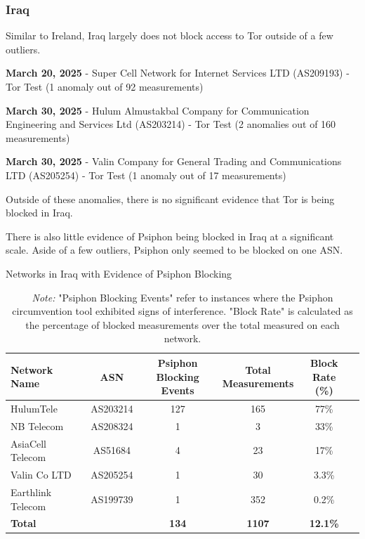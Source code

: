 \subsubsection{Iraq}

Similar to Ireland, Iraq largely does not block access to Tor outside of a few outliers.

\textbf{March 20, 2025} - Super Cell Network for Internet Services LTD (AS209193) - Tor Test (1 anomaly out of 92 measurements)

\textbf{March 30, 2025} - Hulum Almustakbal Company for Communication Engineering and Services Ltd (AS203214) - Tor Test (2 anomalies out of 160 measurements)

\textbf{March 30, 2025} - Valin Company for General Trading and Communications LTD (AS205254) - Tor Test (1 anomaly out of 17 measurements)

Outside of these anomalies, there is no significant evidence that Tor is being blocked in Iraq.

There is also little evidence of Psiphon being blocked in Iraq at a significant scale. Aside of a few outliers, Psiphon only seemed to be blocked on one ASN. 

\vspace{2em}

\begin{table}[H]
\centering
\caption{Networks in Iraq with Evidence of Psiphon Blocking}
\begin{tabular}{lccccc}
\toprule
\textbf{Network Name} & \textbf{ASN} & \shortstack{\textbf{Psiphon} \\ \textbf{Blocking Events}} & \shortstack{\textbf{Total} \\ \textbf{Measurements}} & \shortstack{\textbf{Block} \\ \textbf{Rate (\%)}} \\
\midrule
HulumTele             & AS203214  & 127 & 165  & 77\%   \\
NB Telecom            & AS208324  & 1   & 3    & 33\%   \\
AsiaCell Telecom      & AS51684   & 4   & 23   & 17\%   \\
Valin Co LTD          & AS205254  & 1   & 30   & 3.3\%  \\
Earthlink Telecom     & AS199739  & 1   & 352  & 0.2\%  \\
\bottomrule
\textbf{Total}        &           & \textbf{134} & \textbf{1107} & \textbf{12.1\%} \\
\end{tabular}

\vspace{1em}

\caption*{\textit{Note:} "Psiphon Blocking Events" refer to instances where the Psiphon circumvention tool exhibited signs of interference. "Block Rate" is calculated as the percentage of blocked measurements over the total measured on each network.}
\label{tab:psiphon_block_iraq}
\end{table}

